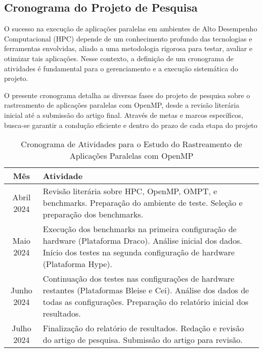 \documentclass[ppgc,diss]{iiufrgs}
\begin{document}
\subsection{Cronograma do Projeto de Pesquisa}

O sucesso na execução de aplicações paralelas em ambientes de Alto Desempenho Computacional (HPC) depende de um conhecimento profundo das tecnologias e ferramentas envolvidas, aliado a uma metodologia rigorosa para testar, avaliar e otimizar tais aplicações. Nesse contexto, a definição de um cronograma de atividades é fundamental para o gerenciamento e a execução sistemática do projeto.

O presente cronograma detalha as diversas fases do projeto de pesquisa sobre o rastreamento de aplicações paralelas com OpenMP, desde a revisão literária inicial até a submissão do artigo final. Através de metas e marcos específicos, busca-se garantir a condução eficiente e dentro do prazo de cada etapa do projeto\\


\begin{table}[h]
	\caption{Cronograma de Atividades para o Estudo do Rastreamento de Aplicações Paralelas com OpenMP}
	\begin{center}
		\begin{tabular}{c|p{10cm}}
			\textbf{Mês} & \textbf{Atividade} \\
			\hline
			\hline
			Abril 2024 & Revisão literária sobre HPC, OpenMP, OMPT, e benchmarks. Preparação do ambiente de teste. Seleção e preparação dos benchmarks. \\
			\hline
			Maio 2024 & Execução dos benchmarks na primeira configuração de hardware (Plataforma Draco). Análise inicial dos dados. Início dos testes na segunda configuração de hardware (Plataforma Hype). \\
			\hline
			Junho 2024 & Continuação dos testes nas configurações de hardware restantes (Plataformas Bleise e Cei). Análise dos dados de todas as configurações. Preparação do relatório inicial dos resultados. \\
			\hline
			Julho 2024 & Finalização do relatório de resultados. Redação e revisão do artigo de pesquisa. Submissão do artigo para revisão. \\
			\hline
		\end{tabular}
	\end{center}
	\label{tbl:cronograma}
\end{table}
\end{document}
